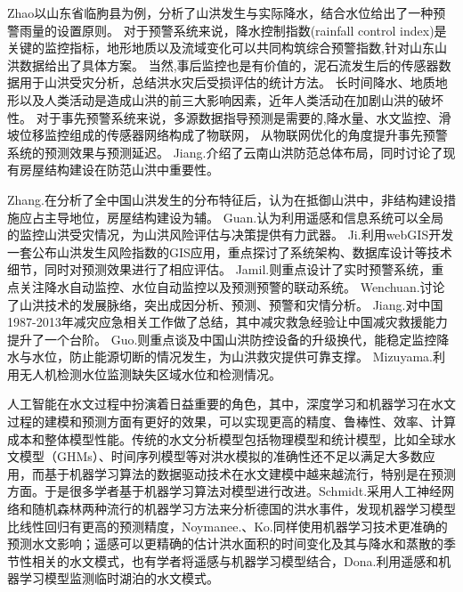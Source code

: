 \documentclass{ctexart}
\begin{document}
Zhao\cite{zhao2011research}以山东省临朐县为例，分析了山洪发生与实际降水，结合水位给出了一种预警雨量的设置原则。
对于预警系统来说，降水控制指数(rainfall control index)是关键的监控指标，地形地质以及流域变化可以共同构筑综合预警指数,\cite{zhao2011research}针对山东山洪数据给出了具体方案。
当然,事后监控也是有价值的，泥石流发生后的传感器数据用于山洪受灾分析，总结洪水灾后受损评估的统计方法\cite{shen2015progress}。
长时间降水、地质地形以及人类活动是造成山洪的前三大影响因素，近年人类活动在加剧山洪的破坏性\cite{hongyu2007elementary}。
对于事先预警系统来说，多源数据指导预测是需要的,降水量、水文监控、滑坡位移监控组成的传感器网络构成了物联网\cite{zeng2014mountain}，
从物联网优化的角度提升事先预警系统的预测效果与预测延迟\cite{zhang2013mountain}。
Jiang.\cite{jiang2017current}介绍了云南山洪防范总体布局，同时讨论了现有房屋结构建设在防范山洪中重要性。

Zhang.\cite{zhang2007zone}在分析了全中国山洪发生的分布特征后，认为在抵御山洪中，非结构建设措施应占主导地位，房屋结构建设为辅。
Guan.\cite{guan2007research}认为利用遥感和信息系统可以全局的监控山洪受灾情况，为山洪风险评估与决策提供有力武器。
Ji.\cite{jiqiu2010design}利用webGIS开发一套公布山洪发生风险指数的GIS应用，重点探讨了系统架构、数据库设计等技术细节，同时对预测效果进行了相应评估。
Jamil.\cite{jamil2013applied}则重点设计了实时预警系统，重点关注降水自动监控、水位自动监控以及预测预警的联动系统。
Wenchuan.\cite{wenchuan2011review}讨论了山洪技术的发展脉络，突出成因分析、预测、预警和灾情分析。
Jiang.\cite{jiang2013implementation}对中国1987-2013年减灾应急相关工作做了总结，其中减灾救急经验让中国减灾救援能力提升了一个台阶。
Guo.\cite{guo2018comprehensive}则重点谈及中国山洪防控设备的升级换代，能稳定监控降水与水位，防止能源切断的情况发生，为山洪救灾提供可靠支撑。
Mizuyama.\cite{mizuyama2011sediment}利用无人机检测水位监测缺失区域水位和检测情况。


人工智能在水文过程中扮演着日益重要的角色\cite{nearing2021role}，其中，深度学习和机器学习在水文过程的建模和预测方面有更好的效果，可以实现更高的精度、鲁棒性、效率、计算成本和整体模型性能\cite{ardabili2019deep}。传统的水文分析模型包括物理模型和统计模型，比如全球水文模型（GHMs）、时间序列模型等对洪水模拟的准确性还不足以满足大多数应用，而基于机器学习算法的数据驱动技术在水文建模中越来越流行，特别是在预测方面\cite{carbajal2018overview}。于是很多学者基于机器学习算法对模型进行改进。Schmidt.\cite{schmidt2020challenges}采用人工神经网络和随机森林两种流行的机器学习方法来分析德国的洪水事件，发现机器学习模型比线性回归有更高的预测精度，Noymanee.\cite{noymanee2019flood}、Ko.\cite{ko2020development}同样使用机器学习技术更准确的预测水文影响；遥感可以更精确的估计洪水面积的时间变化及其与降水和蒸散的季节性相关的水文模式，也有学者将遥感与机器学习模型结合，Dona.\cite{dona2016monitoring}利用遥感和机器学习模型监测临时湖泊的水文模式。
\end{document}
